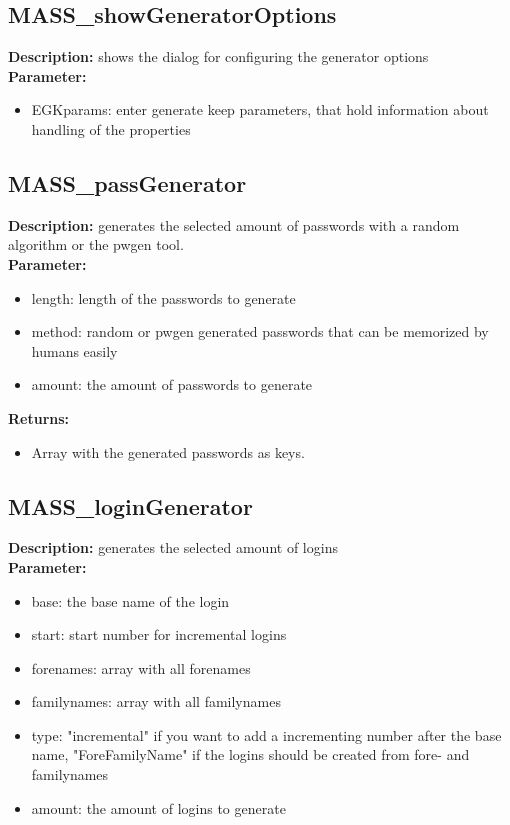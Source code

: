 \subsection{MASS\_showGeneratorOptions}
\textbf{Description:} shows the dialog for configuring the generator options\\
\textbf{Parameter:}
\begin{itemize}
\item EGKparams: enter generate keep parameters, that hold information about handling of the properties
\end{itemize}

\subsection{MASS\_passGenerator}
\textbf{Description:} generates the selected amount of passwords with a random algorithm or the pwgen tool.\\
\textbf{Parameter:}
\begin{itemize}
\item length: length of the passwords to generate
\item method: random or pwgen generated passwords that can be memorized by humans easily
\item amount: the amount of passwords to generate
\end{itemize}
\textbf{Returns:}
\begin{itemize}
\item Array with the generated passwords as keys.
\end{itemize}

\subsection{MASS\_loginGenerator}
\textbf{Description:} generates the selected amount of logins\\
\textbf{Parameter:}
\begin{itemize}
\item base: the base name of the login
\item start: start number for incremental logins
\item forenames: array with all forenames
\item familynames: array with all familynames
\item type: "incremental" if you want to add a incrementing number after the base name, "ForeFamilyName" if the logins should be created from fore- and familynames
\item amount: the amount of logins to generate
\end{itemize}

